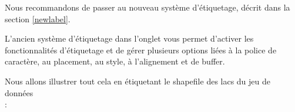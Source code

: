 Nous recommandons de passer au nouveau système d'étiquetage, décrit dans la 
section \ref{newlabel}.

L'ancien système d'étiquetage dans l'onglet  vous permet d'activer 
les fonctionnalités d'étiquetage et de gérer plusieurs options liées à la police 
de caractère, au placement, au style, à l'alignement et de buffer.

Nous allons illustrer tout cela en étiquetant le shapefile des lacs du jeu de 
données\\  :

